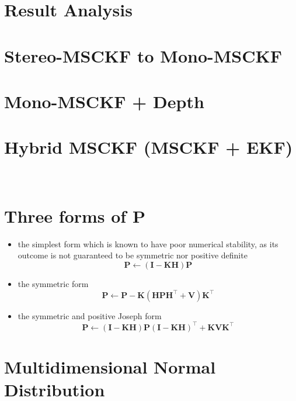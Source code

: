 \documentclass[12pt,a4paper]{article}
\begin{document}
\section{Result Analysis}


\section{Stereo-MSCKF to Mono-MSCKF}

\section{Mono-MSCKF + Depth}

\section{Hybrid MSCKF (MSCKF + EKF) ~\cite{Li2012c}}


\appendix

\section{Three forms of P ~\cite{DBLP:journals/corr/abs-1711-02508}}
\label{appendix:covP}

\begin{itemize}
	\item the simplest form which is known to have poor	numerical stability, as its outcome is not guaranteed to be symmetric nor positive definite
			$$\mathbf{P} \leftarrow(\mathbf{I}-\mathbf{K} \mathbf{H}) \mathbf{P}$$
	\item the symmetric form
			$$\mathbf{P} \leftarrow \mathbf{P}-\mathbf{K}\left(\mathbf{H} \mathbf{P} \mathbf{H}^{\top}+\mathbf{V}\right) \mathbf{K}^{\top}$$
	\item the symmetric and positive Joseph form
			$$\mathbf{P} \leftarrow(\mathbf{I}-\mathbf{K H}) \mathbf{P}(\mathbf{I}-\mathbf{K H})^{\top}+\mathbf{K V K}^{\top}$$
\end{itemize}


\section{Multidimensional Normal Distribution ~\cite{shelley2014monocular}}
\end{document}
